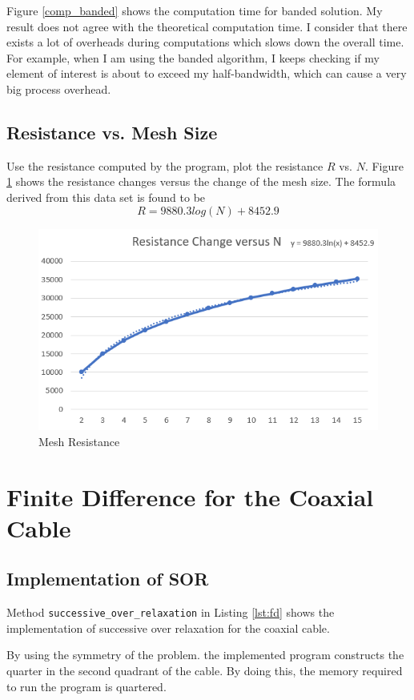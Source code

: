 \documentclass[a4paper,titlepage]{article}
\begin{document}
			Figure \ref{comp_banded} shows the computation time for banded solution. My result does not agree with the theoretical computation time. I consider that there exists a lot of overheads during computations which slows down the overall time. For example, when I am using the banded algorithm, I keeps checking if my element of interest is about to exceed my half-bandwidth, which can cause a very big process overhead. 
			
		\subsection{Resistance vs. Mesh Size}
			Use the resistance computed by the program, plot the resistance $R$ vs. $N$. Figure \ref{mesh_re} shows the resistance changes versus the change of the mesh size. The formula derived from this data set is found to be 
			$$
				R = 9880.3log(N)+8452.9
			$$
			\begin{figure}[!h]
				\centering
				\includegraphics[width=\linewidth]{mesh_resistance}
				\caption{Mesh Resistance}
				\label{mesh_re}
			\end{figure}
	\section{Finite Difference for the Coaxial Cable}
		\subsection{Implementation of SOR}
			Method \texttt{successive_over_relaxation} in Listing \ref{lst:fd} shows the implementation of successive over relaxation for the coaxial cable.
			
			By using the symmetry of the problem. the implemented program constructs the quarter in the second quadrant of the cable. By doing this, the memory required to run the program is quartered.
			
\end{document}
